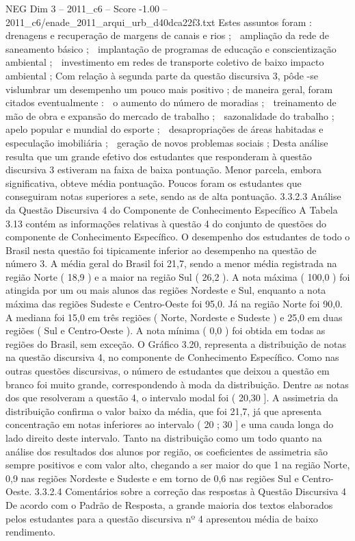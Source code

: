 \begin{textsample}{NEG Dim 3 – 2011\_c6 – Score -1.00 – 2011\_c6/enade\_2011\_arqui\_urb\_d40dca22f3.txt}
Estes assuntos foram :  drenagens e recuperação de margens de canais e rios ;  ampliação da rede de saneamento básico ;  implantação de programas de educação e conscientização ambiental ;  investimento em redes de transporte coletivo de baixo impacto ambiental ; Com relação à segunda parte da questão discursiva 3, pôde -se vislumbrar um desempenho um pouco mais positivo ; de maneira geral, foram citados eventualmente :  o aumento do número de moradias ;  treinamento de mão de obra e expansão do mercado de trabalho ;  sazonalidade do trabalho ;  apelo popular e mundial do esporte ;  desapropriações de áreas habitadas e especulação imobiliária ;  geração de novos problemas sociais ; Desta análise resulta que um grande efetivo dos estudantes que responderam à questão discursiva 3 estiveram na faixa de baixa pontuação.
Menor parcela, embora significativa, obteve média pontuação.
Poucos foram os estudantes que conseguiram notas superiores a sete, sendo as de alta pontuação. 3.3.2.3 Análise da Questão Discursiva 4 do Componente de Conhecimento Específico A Tabela 3.13 contém as informações relativas à questão 4 do conjunto de questões do componente de Conhecimento Específico.
O desempenho dos estudantes de todo o Brasil nesta questão foi tipicamente inferior ao desempenho na questão de número 3.
A média geral do Brasil foi 21,7, sendo a menor média registrada na região Norte ( 18,9 ) e a maior na região Sul ( 26,2 ).
A nota máxima ( 100,0 ) foi atingida por um ou mais alunos das regiões Nordeste e Sul, enquanto a nota máxima das regiões Sudeste e Centro-Oeste foi 95,0.
Já na região Norte foi 90,0.
A mediana foi 15,0 em três regiões ( Norte, Nordeste e Sudeste ) e 25,0 em duas regiões ( Sul e Centro-Oeste ).
A nota mínima ( 0,0 ) foi obtida em todas as regiões do Brasil, sem exceção.
O Gráfico 3.20, representa a distribuição de notas na questão discursiva 4, no componente de Conhecimento Específico.
Como nas outras questões discursivas, o número de estudantes que deixou a questão em branco foi muito grande, correspondendo à moda da distribuição.
Dentre as notas dos que resolveram a questão 4, o intervalo modal foi ( 20,30 ].
A assimetria da distribuição confirma o valor baixo da média, que foi 21,7, já que apresenta concentração em notas inferiores ao intervalo ( 20 ; 30 ] e uma cauda longa do lado direito deste intervalo.
Tanto na distribuição como um todo quanto na análise dos resultados dos alunos por região, os coeficientes de assimetria são sempre positivos e com valor alto, chegando a ser maior do que 1 na região Norte, 0,9 nas regiões Nordeste e Sudeste e em torno de 0,6 nas regiões Sul e Centro-Oeste. 3.3.2.4 Comentários sobre a correção das respostas à Questão Discursiva 4 De acordo com o Padrão de Resposta, a grande maioria dos textos elaborados pelos estudantes para a questão discursiva nº 4 apresentou média de baixo rendimento.

\end{textsample}
